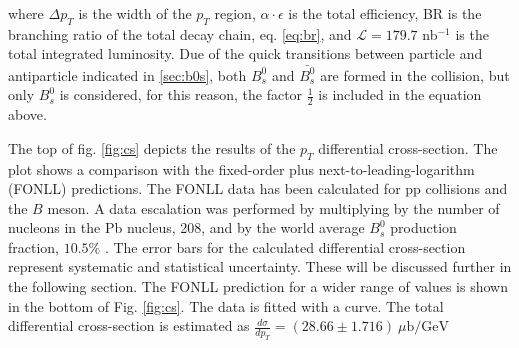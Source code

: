 where $\Delta p_T$ is the width of the $p_T$ region, $\alpha \cdot \epsilon$ is the total efficiency, BR is the branching ratio of the total decay chain, eq. \ref{eq:br}, and $\mathcal{L} = 179.7$ nb$^{-1}$  is the total integrated luminosity. Due of the quick transitions between particle and antiparticle indicated in \ref{sec:b0s}, both $B^0_s$ and $\bar{B^0_s}$ are formed in the collision, but only $B^0_s$ is considered, for this reason, the factor $\frac{1}{2}$ is included in the equation above. 

The top of fig. \ref{fig:cs} depicts the results of the $p_T$ differential cross-section. The plot shows a comparison with the fixed-order plus next-to-leading-logarithm (FONLL) predictions. The FONLL data has been calculated for pp collisions and the $B$ meson. A data escalation was performed by multiplying by the number of nucleons in the Pb nucleus, 208, and by the world average $B^{0}_s$ production fraction, $10.5 \%$ \cite{khachatryan2016study}. The error bars for the calculated differential cross-section represent systematic and statistical uncertainty. These will be discussed further in the following section. The FONLL prediction for a wider range of values is shown in the bottom of Fig. \ref{fig:cs}. The data is fitted with a curve. The total differential cross-section is estimated as $\frac{d \sigma}{dp_T} = (28.66 \pm 1.716) \ \mu\text{b}/\text{GeV}$

